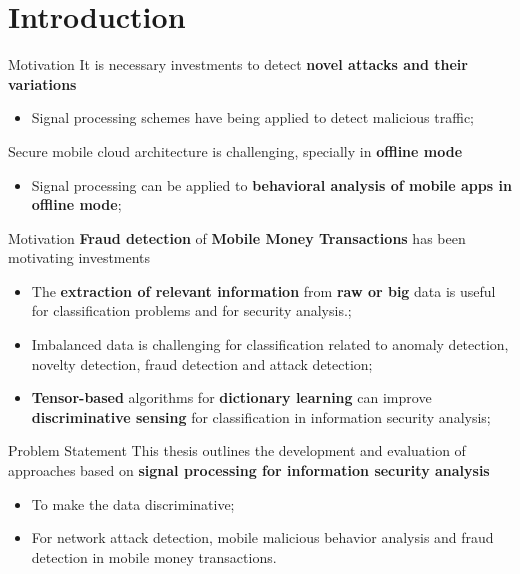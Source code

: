 \documentclass[newPxFont, numfooter, sectionpages]{beamer}
\begin{document}
\section{Introduction}
\begin{frame}[c]{Motivation}
	It is necessary investments to detect \textbf{novel attacks and their variations}
	\begin{itemize}
		\item Signal processing schemes have being applied to detect malicious traffic;		
	\end{itemize}
	Secure mobile cloud architecture is challenging, specially in \textbf{offline mode}
	\begin{itemize}
		\item Signal processing can be applied to \textbf{behavioral analysis of mobile apps in offline mode};		
	\end{itemize}
\end{frame}
\begin{frame}[c]{Motivation}
	\textbf{Fraud detection} of \textbf{Mobile Money Transactions} has been motivating investments
	\begin{itemize}
		\item The \textbf{extraction of relevant information} from \textbf{raw or big} data is useful for classification problems and for security analysis.;
		\item Imbalanced data is challenging for classification related to anomaly detection, novelty detection, fraud detection and attack detection;
		\item \textbf{Tensor-based} algorithms for \textbf{dictionary learning} can improve \textbf{discriminative sensing} for classification in information security analysis;
	\end{itemize}
\end{frame}
\begin{frame}[c]{Problem Statement}
	This thesis outlines the development and evaluation of approaches based on \textbf{signal processing for information security analysis}
	\begin{itemize}
		\item To make the data discriminative;
		\item For network attack detection, mobile malicious behavior analysis and fraud detection in mobile money transactions.
	\end{itemize}
\end{frame}
\end{document}
